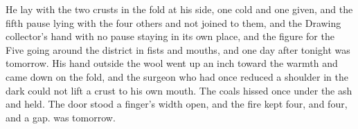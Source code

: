 He lay with the two crusts in the fold at his side, one cold and one given, and the fifth pause lying with the four others and not joined to them, and the Drawing collector's hand with no pause staying in its own place, and the figure for the Five going around the district in fists and mouths, and one day after tonight was tomorrow. His hand outside the wool went up an inch toward the warmth and came down on the fold, and the surgeon who had once reduced a shoulder in the dark could not lift a crust to his own mouth. The coals hissed once under the ash and held. The door stood a finger's width open, and the fire kept four, and four, and a gap.  was tomorrow.
